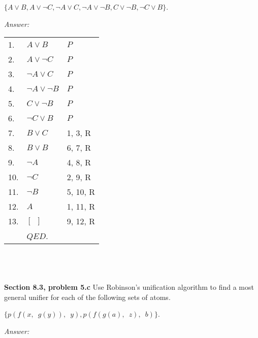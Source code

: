 \documentclass[12pt]{article}
\begin{document}
$\{A \lor B, A \lor \neg C, \neg A \lor C, \neg A \lor \neg B, C \lor \neg B, \neg C 
\lor B \}$.

\emph{Answer:} 

\begin{tabular}{p{.8cm}p{8.5cm}l}
1.  & $A \lor B$           & $P$ \\
2.  & $A \lor \neg C$      & $P$ \\
3.  & $\neg A \lor C$      & $P$ \\
4.  & $\neg A \lor \neg B$ & $P$ \\   
5.  & $C \lor \neg B$      & $P$ \\
6.  & $\neg C \lor B$      & $P$ \\ 
7.  & $B \lor C$           & 1, 3, R \\
8.  & $B \lor B$           & 6, 7, R \\
9.  & $\neg A$             & 4, 8, R \\
10. & $\neg C$             & 2, 9, R \\
11. & $\neg B$             & 5, 10, R \\
12. & $A$                  & 1, 11, R \\
13. & $[ \enspace ]$       & 9, 12, R \\ 
& $QED$.\\
\end{tabular}
\\
\\
\\
\textbf{Section 8.3, problem 5.c}   Use Robinson’s unification algorithm to find a most general 
unifier for each of the following sets of atoms.

$\{ p(f(x, \enspace g(y)), \enspace y), p(f(g (a), \enspace z), \enspace b) \}$.

\emph{Answer:} 
\end{document}
